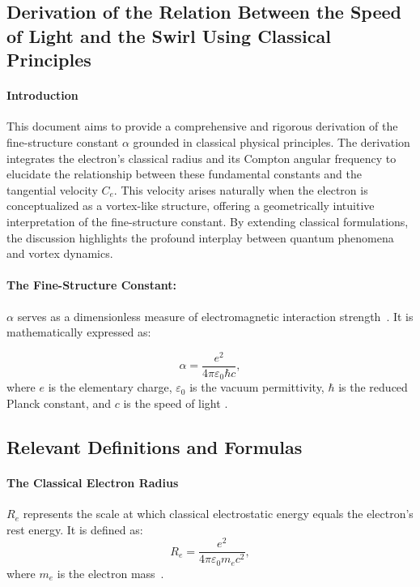 
\subsection{Derivation of the Relation Between the Speed of Light and the Swirl Using Classical Principles}\label{subsec:derivation-of-the-relation-between-the-speed-of-light-and-the-swirl-using-classical-principles}

\paragraph*{Introduction}
    This document aims to provide a comprehensive and rigorous derivation of the fine-structure constant $\alpha$ grounded in classical physical principles.
    The derivation integrates the electron's classical radius and its Compton angular frequency to elucidate the relationship between these fundamental constants and the tangential velocity $C_e$.
    This velocity arises naturally when the electron is conceptualized as a vortex-like structure, offering a geometrically intuitive interpretation of the fine-structure constant.
    By extending classical formulations, the discussion highlights the profound interplay between quantum phenomena and vortex dynamics.


\paragraph*{The Fine-Structure Constant:}
 $\alpha$ serves as a dimensionless measure of electromagnetic interaction strength~\cite{maxwell1861}.
It is mathematically expressed as:

\begin{equation*}
    \alpha = \frac{e^2}{4\pi \varepsilon_0 \hbar c},
\end{equation*}
where $e$ is the elementary charge, $\varepsilon_0$ is the vacuum permittivity, $\hbar$ is the reduced Planck constant, and $c$ is the speed of light \cite{dirac1930quantum}.

\subsection*{Relevant Definitions and Formulas}
\paragraph*{The Classical Electron Radius}
$R_e$ represents the scale at which classical electrostatic energy equals the electron's rest energy. It is defined as:
\begin{equation*}
    R_e = \frac{e^2}{4\pi \varepsilon_0 m_e c^2},
\end{equation*}
where $m_e$ is the electron mass~\cite{helmholtz1858}.

